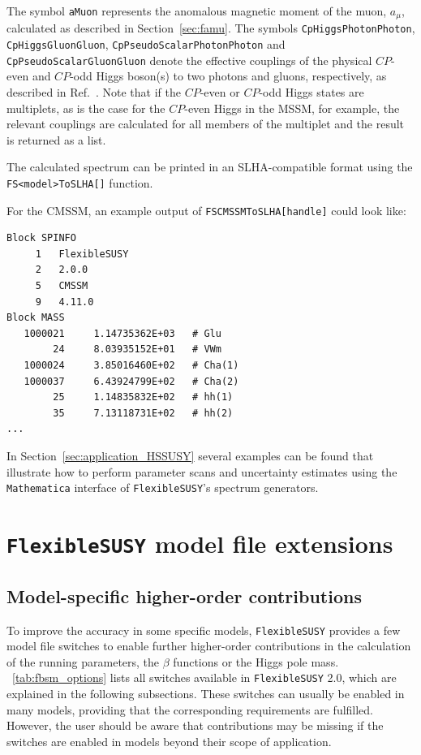 \documentclass[final,3p,11pt,pdflatex]{elsarticle}
\makeatletter
\newcommand{\fs}{\texttt{FlexibleSUSY}\@\xspace}
\newcommand{\fstwo}{\fs 2.0\@\xspace}
\newcommand{\mathematica}{\texttt{Ma\-the\-ma\-ti\-ca}\xspace}
\newcommand{\code}[1]{\lstinline|#1|}  %
\newcommand{\amu}{\ensuremath{a_\mu}\xspace}
\newcommand{\secref}[1]{Section~\ref{#1}}
\newcommand{\tabref}[1]{\tablename~\ref{#1}}
\newcommand{\CP}{\ensuremath{CP}\xspace}
\makeatother
\begin{document}
%
The symbol \code{aMuon} represents the anomalous magnetic moment of
the muon, $\amu$, calculated as described in \secref{sec:famu}.  The
symbols \code{CpHiggsPhotonPhoton}, \code{CpHiggsGluonGluon},
\code{CpPseudoScalarPhotonPhoton} and \code{CpPseudoScalarGluonGluon}
denote the effective couplings of the physical \CP-even and \CP-odd Higgs
boson(s) to two photons and gluons, respectively, as described in
Ref.~\cite{Staub:2016dxq}.  Note that if the \CP-even or \CP-odd Higgs states
are multiplets, as is the case for the \CP-even Higgs in the MSSM, for
example, the relevant couplings are calculated for all members of the
multiplet and the result is returned as a list.

The calculated spectrum can be printed in an SLHA-compatible format
using the \code{FS<model>ToSLHA[]} function.
%
\begin{example}
  For the CMSSM, an example output of \code{FSCMSSMToSLHA[handle]}
  could look like:
\begin{lstlisting}
Block SPINFO
     1   FlexibleSUSY
     2   2.0.0
     5   CMSSM
     9   4.11.0
Block MASS
   1000021     1.14735362E+03   # Glu
        24     8.03935152E+01   # VWm
   1000024     3.85016460E+02   # Cha(1)
   1000037     6.43924799E+02   # Cha(2)
        25     1.14835832E+02   # hh(1)
        35     7.13118731E+02   # hh(2)
...
\end{lstlisting}
\end{example}
%
In \secref{sec:application_HSSUSY} several examples can be found that
illustrate how to perform parameter scans and uncertainty
estimates using the \mathematica interface of \fs's spectrum
generators.

\section{\fs model file extensions}
\label{sec:model_file_extensions}

\subsection{Model-specific higher-order contributions}
\label{sec:model_specific_contributions}
To improve the accuracy in some specific models, \fs provides a few
model file switches to enable further higher-order contributions in
the calculation of the running parameters, the $\beta$ functions or
the Higgs pole mass.  \tabref{tab:fbsm_options} lists all switches
available in \fstwo, which are explained in the following subsections.
%
These switches can usually be enabled in many models, providing that
the corresponding requirements are fulfilled.  However, the user
should be aware that contributions may be missing if the switches are
enabled in models beyond their scope of application.
\end{document}
